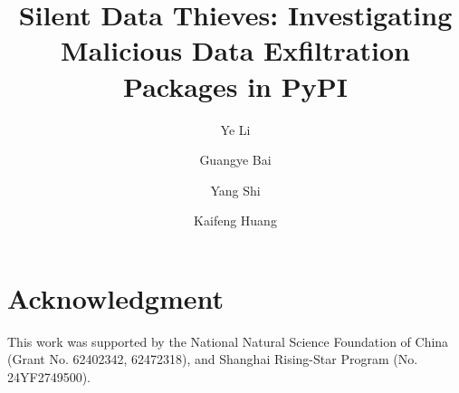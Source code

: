 




\usepackage[numbers]{natbib}

\newcommand{\todo}[1]{\textcolor{blue}{#1}}

\usepackage{tcolorbox}

\usepackage{tikz}
\newcommand{\labelmtd}[1]{\tikz\draw[black,fill=white] (0,0) circle [radius=0.13] node {\tiny #1};}




\title{Silent Data Thieves: Investigating Malicious Data Exfiltration Packages in PyPI}



\author{Ye Li \and Guangye Bai \and Yang Shi \and Kaifeng Huang}


\maketitle

\begin{abstract}

\end{abstract}







 





\section*{Acknowledgment}

This work was supported by the National Natural Science Foundation of China (Grant No. 62402342, 62472318), and Shanghai Rising-Star Program (No. 24YF2749500).









